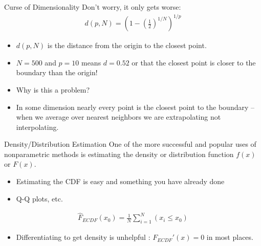 \documentclass[11pt,handout,xcolor=pdftex,dvipsnames,table,mathserif]{beamer}
\begin{document}
\begin{frame}{Curse of Dimensionality}
Don't worry, it only gets worse:
\begin{eqnarray*}
d(p,N) = \left(1-\left(\frac{1}{2} \right)^{1/N} \right)^{1/p}
\end{eqnarray*}

\begin{itemize}
\item $d(p,N)$ is the distance from the origin to the closest point.
\item $N=500$ and $p=10$ means $d = 0.52$ or that the closest point is closer to the boundary than the origin!
\item Why is this a problem?
\item In some dimension nearly every point is the closest point to the boundary -- when we average over nearest neighbors we are \alert{extrapolating} not \alert{interpolating}.
\end{itemize}
\end{frame}


\begin{frame}{Density/Distribution Estimation}
One of the more successful and popular uses of nonparametric methods is estimating the density or distribution function $f(x)$ or $F(x)$.
\begin{itemize}
\item Estimating the CDF is easy and something you have already done
\item Q-Q plots, etc.
\end{itemize}
\begin{eqnarray*}
\hat{F}_{ECDF}(x_0) = \frac{1}{N} \sum_{i=1}^N (x_i \leq x_0 )
\end{eqnarray*}
\begin{itemize}
\item Differentiating to get density is unhelpful : $F_{ECDF}'(x) = 0$ in most places.
\end{itemize}
\end{frame}
\end{document}

